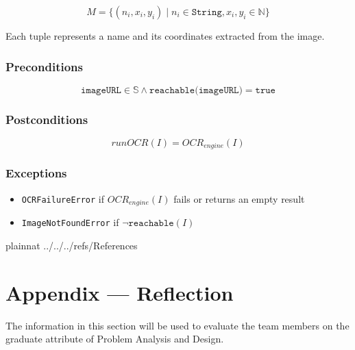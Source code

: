 \documentclass[12pt, titlepage]{article}
\begin{document}
\[
M = \{ (n_i, x_i, y_i) \mid n_i \in \texttt{String}, x_i, y_i \in \mathbb{N} \}
\]

Each tuple represents a name and its coordinates extracted from the image.

\subsubsection*{Preconditions}
\[
\texttt{imageURL} \in \mathbb{S} \land \texttt{reachable(imageURL)} = \texttt{true}
\]

\subsubsection*{Postconditions}
\[
runOCR(I) = OCR_{engine}(I)
\]

\subsubsection*{Exceptions}
\begin{itemize}
  \item \texttt{OCRFailureError} if $OCR_{engine}(I)$ fails or returns an empty result
  \item \texttt{ImageNotFoundError} if $\neg \texttt{reachable}(I)$
\end{itemize}


 {plainnat}
 {../../../refs/References}

\newpage


\newpage{}

\section*{Appendix --- Reflection}



The information in this section will be used to evaluate the team members on the
graduate attribute of Problem Analysis and Design.


\end{document}
